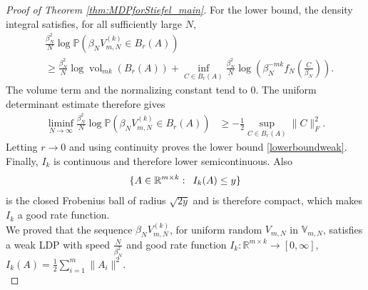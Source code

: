 \documentclass[11pt,a4paper,twoside]{article}
\newcommand{\R}{\mathbb R}
\DeclareMathOperator{\vol}{vol}
\theoremstyle{definition}
\begin{document}
\begin{proof}[Proof of Theorem \ref{thm:MDPforStiefel_main}]
		For the lower bound, the density integral satisfies, for all sufficiently large $N$,
		\begin{align*}
		&\frac{\beta_N^2}{N}\log \mathbb{P}\left(\beta_N V_{m,N}^{(k)} \in B_r(A)\right)\\
		&\ge \frac{\beta_N^2}{N}\log\vol_{mk}(B_r(A))
		+\inf_{C\in B_r(A)}\frac{\beta_N^2}{N}\log\left(\beta_N^{-mk}f_N\left(\frac{C}{\beta_N}\right)\right).
		\end{align*}
		The volume term and the normalizing constant tend to $0$. The uniform determinant estimate therefore gives
		\begin{align*}
		\liminf_{N\to\infty}\frac{\beta_N^2}{N}\log \mathbb{P}\left(\beta_N V_{m,N}^{(k)} \in B_r(A)\right)
		&\ge -\frac{1}{2}\sup_{C\in B_r(A)}\|C\|_F^2.
		\end{align*}
		Letting $r\to0$ and using continuity proves the lower bound \eqref{lowerboundweak}.
		Finally, $I_k$ is continuous and therefore lower semicontinuous. Also 
		$$
		\{A\in\R^{m\times k}:\enskip I_k(A)\le y\}
		$$ 
		is the closed Frobenius ball of radius $\sqrt{2y}$ and is therefore compact, which makes $I_k$ a good rate function.\\
		
		\noindent We proved that the sequence $\beta_N V_{m,N}^{(k)}$, for uniform random $V_{m,N}$ in $\mathbb{V}_{m,N}$, satisfies a weak LDP with speed $\frac{N}{\beta_N^2}$ and good rate function $I_k:\R^{m\times k}\to [0,\infty]$, $I_k(A) = \frac{1}{2}\sum_{i=1}^m \|A_i\|^2$. \\
		

\end{proof}
\end{document}
